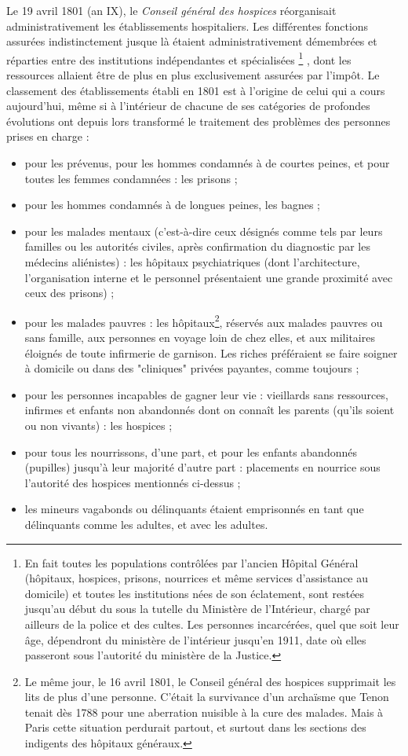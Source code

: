  Le 19 avril 1801 (an IX), le \emph{Conseil général des hospices} réorganisait administrativement les établissements hospitaliers. Les différentes fonctions assurées indistinctement jusque là étaient administrativement démembrées et réparties entre des institutions indépendantes et spécialisées%
\footnote{En fait toutes les populations contrôlées par l'ancien Hôpital Général (hôpitaux, hospices, prisons, nourrices et même services d'assistance au domicile) et toutes les institutions nées de son éclatement, sont restées jusqu'au début du  sous la tutelle du Ministère de l'Intérieur, chargé par ailleurs de la police et des cultes. Les personnes incarcérées, quel que soit leur âge, dépendront du ministère de l'intérieur jusqu'en 1911, date où elles passeront sous l'autorité du ministère de la Justice.}%
, dont les ressources allaient être de plus en plus exclusivement assurées par l'impôt. Le classement des établissements établi en 1801 est à l'origine de celui qui a cours aujourd'hui, même si à l'intérieur de chacune de ses catégories de profondes évolutions ont depuis lors transformé le traitement des problèmes des personnes prises en charge :
\begin{itemize}
\item pour les prévenus, pour les hommes condamnés à de courtes peines, et pour toutes les femmes condamnées : les prisons ; 
\item pour les hommes condamnés à de longues peines, les bagnes ;
\item pour les malades mentaux (c'est-à-dire ceux désignés comme tels par leurs familles ou les autorités civiles, après confirmation du diagnostic par les médecins aliénistes) : les hôpitaux psychiatriques (dont l'architecture, l'organisation interne et le personnel présentaient une grande proximité avec ceux des prisons) ;
\item pour les malades pauvres : les hôpitaux\footnote{Le même jour, le 16 avril 1801, le Conseil général des hospices supprimait les lits de plus d'une personne. C'était la survivance d'un archaïsme que Tenon tenait dès 1788 pour une aberration nuisible à la cure des malades. Mais à Paris cette situation perdurait partout, et surtout dans les sections des indigents des hôpitaux généraux.}, réservés aux malades pauvres ou sans famille, aux personnes en voyage loin de chez elles, et aux militaires éloignés de toute infirmerie de garnison. Les riches préféraient se faire soigner à domicile ou dans des "cliniques" privées payantes, comme toujours ;
\item pour les personnes incapables de gagner leur vie : vieillards sans ressources, infirmes et enfants non abandonnés dont on connaît les parents (qu'ils soient ou non vivants) : les hospices ;
\item pour tous les nourrissons, d'une part, et pour les enfants abandonnés (pupilles) jusqu'à leur majorité d'autre part : placements en nourrice sous l'autorité des hospices mentionnés ci-dessus ;
\item les mineurs vagabonds ou délinquants étaient emprisonnés en tant que délinquants comme les adultes, et avec les adultes. 
 \end{itemize}

 


